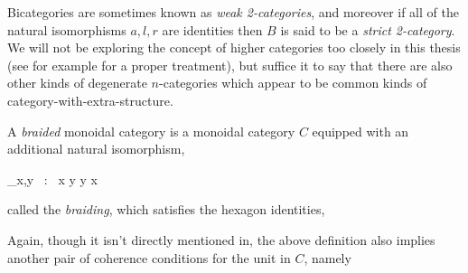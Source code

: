  Bicategories are sometimes known as \emph{weak 2-categories}, and moreover if all of the natural isomorphisms $a, l, r$ are identities then $B$ is said to be a \emph{strict 2-category}. We will not be exploring the concept of higher categories too closely in this thesis (see for example \cite{hohc} for a proper treatment), but suffice it to say that there are also other kinds of degenerate $n$-categories which appear to be common kinds of category-with-extra-structure. 

\begin{defn} \label{bdmoncat} A \emph{braided} monoidal category is a monoidal category $C$ equipped with an additional natural isomorphism,
\begin{eq*} \beta_{x,y} \, : \, x \otimes y \longrightarrow y \otimes x \end{eq*}
called the \emph{braiding}, which satisfies the hexagon identities,
\begin{eq*}  \end{eq*}
\begin{eq*}  \end{eq*}
\end{defn}

Again, though it isn't directly mentioned in, the above definition also implies another pair of coherence conditions for the unit in $C$, namely
\begin{eq*}  \end{eq*}

